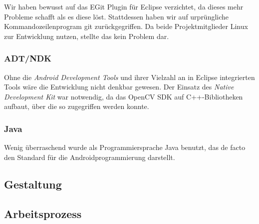 Wir haben bewusst auf das EGit Plugin für Eclipse verzichtet, da dieses mehr
Probleme schafft als es diese löst. Stattdessen haben wir auf urprüngliche
Kommandozeilenprogram git zurückgegriffen. Da beide Projektmitglieder Linux zur
Entwicklung nutzen, stellte das kein Problem dar.

\subsubsection{ADT/NDK}  %

Ohne die \emph{Android Development Tools} und ihrer Vielzahl an in Eclipse
integrierten Tools wäre die Entwicklung nicht denkbar gewesen. Der Einsatz des
\emph{Native Development Kit} war notwendig, da das OpenCV SDK auf
C++-Bibliotheken aufbaut, über die so zugegriffen werden konnte.

\subsubsection{Java}  %

Wenig überraschend wurde als Programmiersprache Java benutzt, das de facto den
Standard für die Androidprogrammierung darstellt.

\subsection{Gestaltung}  %
\subsection{Arbeitsprozess}  %

